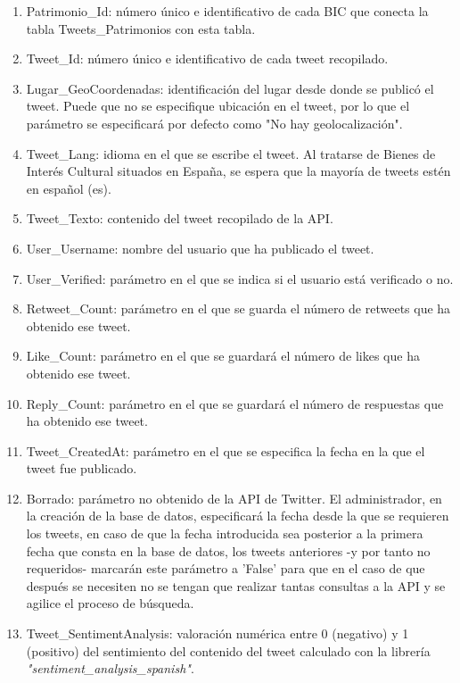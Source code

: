 \begin{itemize}
\begin{enumerate}
        \item Patrimonio\_Id: número único e identificativo de cada BIC que conecta la tabla Tweets\_Patrimonios con esta tabla.
        \item Tweet\_Id: número único e identificativo de cada tweet recopilado.
        \item Lugar\_GeoCoordenadas: identificación del lugar desde donde se publicó el tweet. Puede que no se especifique ubicación en el tweet, por lo que el parámetro se especificará por defecto como "No hay geolocalización".
        \item Tweet\_Lang: idioma en el que se escribe el tweet. Al tratarse de Bienes de Interés Cultural situados en España, se espera que la mayoría de tweets estén en español (es).
        \item Tweet\_Texto: contenido del tweet recopilado de la API.
        \item User\_Username: nombre del usuario que ha publicado el tweet.
        \item User\_Verified: parámetro en el que se indica si el usuario está verificado o no.
        \item Retweet\_Count: parámetro en el que se guarda el número de retweets que ha obtenido ese tweet.
        \item Like\_Count: parámetro en el que se guardará el número de likes que ha obtenido ese tweet.
        \item Reply\_Count: parámetro en el que se guardará el número de respuestas que ha obtenido ese tweet.
        \item Tweet\_CreatedAt: parámetro en el que se especifica la fecha en la que el tweet fue publicado.
        \item Borrado: parámetro no obtenido de la API de Twitter. El administrador, en la creación de la base de datos, especificará la fecha desde la que se requieren los tweets, en caso de que la fecha introducida sea posterior a la primera fecha que consta en la base de datos, los tweets anteriores -y por tanto no requeridos- marcarán este parámetro a 'False' para que en el caso de que después se necesiten no se tengan que realizar tantas consultas a la API y se agilice el proceso de búsqueda.
        \item Tweet\_SentimentAnalysis: valoración numérica entre 0 (negativo) y 1 (positivo) del sentimiento del contenido del tweet calculado con la librería \textit{"sentiment\_analysis\_spanish"}.
    \end{enumerate}
\end{itemize}

